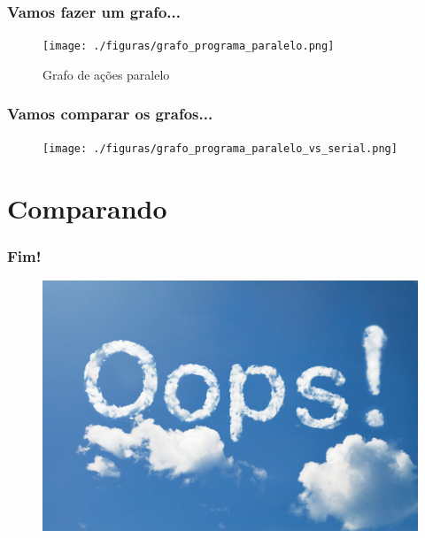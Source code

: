 \documentclass[10pt]{beamer}
\begin{document}
		\begin{frame}%
		\frametitle{Vamos fazer um grafo...}
			\begin{figure}
			\centering
				\texttt{[image: ./figuras/grafo\_programa\_paralelo.png]}
				\caption{Grafo de ações paralelo}
			\end{figure}
		\end{frame}

		\begin{frame}%
		\frametitle{Vamos comparar os grafos...}
			\begin{figure}
			\centering
				\texttt{[image: ./figuras/grafo\_programa\_paralelo\_vs\_serial.png]}
			\end{figure}
		\end{frame}

\section{Comparando}





\begin{frame}%
\frametitle{\centering Fim!}
	\begin{figure}
	\centering
		\includegraphics[scale=2]{./figuras/cloud_oops.jpg}
	\end{figure}
\end{frame}
\end{document}

